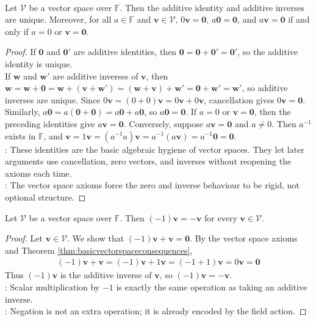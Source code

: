 \begin{theorem} \label{thm:basicvectorspaceconsequences} \\
Let $\mathcal{V}$ be a vector space over $\mathbb{F}$. Then the additive identity and additive inverses are unique. Moreover, for all $a \in \mathbb{F}$ and $\mathbf{v} \in \mathcal{V}$, $0\mathbf{v} = \mathbf{0}$, $a\mathbf{0} = \mathbf{0}$, and $a\mathbf{v} = \mathbf{0}$ if and only if $a = 0$ or $\mathbf{v} = \mathbf{0}$.
\begin{proof}
If $\mathbf{0}$ and $\mathbf{0}'$ are additive identities, then $\mathbf{0} = \mathbf{0} + \mathbf{0}' = \mathbf{0}'$, so the additive identity is unique.\\
If $\mathbf{w}$ and $\mathbf{w}'$ are additive inverses of $\mathbf{v}$, then $\mathbf{w} = \mathbf{w} + \mathbf{0} = \mathbf{w} + (\mathbf{v} + \mathbf{w}') = (\mathbf{w} + \mathbf{v}) + \mathbf{w}' = \mathbf{0} + \mathbf{w}' = \mathbf{w}'$, so additive inverses are unique. Since $0\mathbf{v} = (0+0)\mathbf{v} = 0\mathbf{v} + 0\mathbf{v}$, cancellation gives $0\mathbf{v} = \mathbf{0}$.\\
Similarly, $a\mathbf{0} = a(\mathbf{0}+\mathbf{0}) = a\mathbf{0} + a\mathbf{0}$, so $a\mathbf{0} = \mathbf{0}$. If $a = 0$ or $\mathbf{v} = \mathbf{0}$, then the preceding identities give $a\mathbf{v} = \mathbf{0}$. Conversely, suppose $a\mathbf{v} = \mathbf{0}$ and $a \neq 0$. Then $a^{-1}$ exists in $\mathbb{F}$, and $\mathbf{v} = 1\mathbf{v} = (a^{-1}a)\mathbf{v} = a^{-1}(a\mathbf{v}) = a^{-1}\mathbf{0} = \mathbf{0}$.\\
: These identities are the basic algebraic hygiene of vector spaces. They let later arguments use cancellation, zero vectors, and inverses without reopening the axioms each time.\\
: The vector space axioms force the zero and inverse behaviour to be rigid, not optional structure.
\end{proof}
\end{theorem}

\begin{corollary} \label{cor:negativeoneactsasinverse}
Let $\mathcal{V}$ be a vector space over $\mathbb{F}$. Then $(-1)\mathbf{v} = -\mathbf{v}$ for every $\mathbf{v} \in \mathcal{V}$.
\begin{proof}
Let $\mathbf{v} \in \mathcal{V}$. We show that $(-1)\mathbf{v} + \mathbf{v} = \mathbf{0}$. By the vector space axioms and Theorem \ref{thm:basicvectorspaceconsequences},
\begin{align}
(-1)\mathbf{v} + \mathbf{v} = (-1)\mathbf{v} + 1\mathbf{v} = (-1+1)\mathbf{v} = 0\mathbf{v} = \mathbf{0} \nonumber
\end{align}
Thus $(-1)\mathbf{v}$ is the additive inverse of $\mathbf{v}$, so $(-1)\mathbf{v} = -\mathbf{v}$.\\
: Scalar multiplication by $-1$ is exactly the same operation as taking an additive inverse.\\
: Negation is not an extra operation; it is already encoded by the field action.
\end{proof}
\end{corollary}

